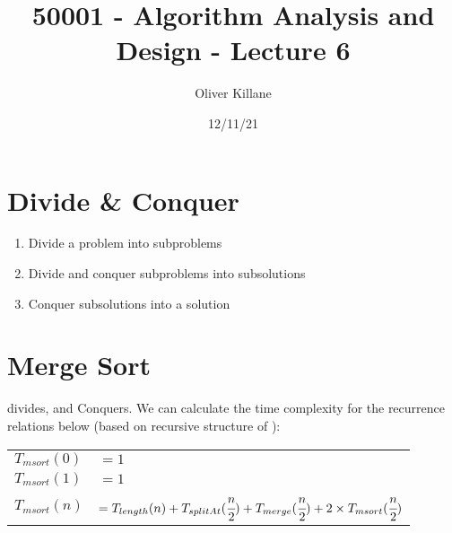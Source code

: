 \documentclass{report}
\title{50001 - Algorithm Analysis and Design - Lecture 6}
\author{Oliver Killane}
\date{12/11/21}
\begin{document}
    \maketitle

    \section*{Divide \& Conquer}
        \begin{enumerate}
            \item Divide a problem into subproblems
            \item Divide and conquer subproblems into subsolutions
            \item Conquer subsolutions into a solution
        \end{enumerate}
    
    \section*{Merge Sort}
         divides, and  Conquers. We can calculate the time complexity for the recurrence relations below (based on recursive structure of ):
        \\ \begin{tabular}{l l }
            $T_{msort}(0) $ & $= 1 $ \\
            $T_{msort}(1) $ & $= 1 $ \\
            $T_{msort}(n) $ & $= T_{length}(n) + T_{splitAt}(\cfrac{n}{2}) + T_{merge}(\cfrac{n}{2}) + 2 \times T_{msort}(\cfrac{n}{2}) $ \\
        \end{tabular}
\end{document}
